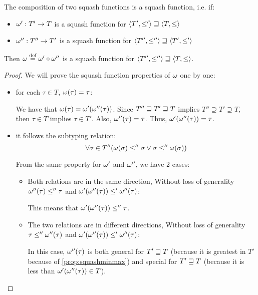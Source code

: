 \documentclass[main.tex]{subfiles}
\begin{document}
\begin{property}\label{prop:squashcomp}
    The composition of two squash functions is a squash function, i.e. if:
    \begin{itemize}
        \item $\omega' : T' \rightarrow T$ is a squash function for
            $\langle T', \leq' \rangle \sqsupseteq \langle T, \leq \rangle$
        \item $\omega'' : T'' \rightarrow T'$ is a squash function for
            $\langle T'', \leq'' \rangle \sqsupseteq \langle T', \leq' \rangle$
    \end{itemize}
    Then $\omega \overset{\text{\scriptsize def}}{=} \omega' \circ \omega''$ is a squash function
    for $\langle T'', \leq'' \rangle \sqsupseteq \langle T, \leq \rangle$.
\end{property}
\begin{proof}
    We will prove the squash function properties of $\omega$ one by one:
    \begin{itemize}
        \item for each $\tau \in T$, $\omega(\tau) = \tau$:

            We have that $\omega(\tau) = \omega'(\omega''(\tau))$.
            Since $T'' \sqsupseteq T' \sqsupseteq T$ implies $T'' \supseteq T' \supseteq T$,
            then $\tau \in T$ implies $\tau \in T'$. Also, $\omega''(\tau) = \tau$.
            Thus, $\omega'(\omega''(\tau)) = \tau$.

        \item it follows the subtyping relation:
            \[ \forall \sigma \in T''
                (\omega(\sigma) \leq'' \sigma \lor \sigma \leq'' \omega(\sigma)) \]

            From the same property for $\omega'$ and $\omega''$, we have 2 cases:
            \begin{itemize}
                \item Both relations are in the same direction,
                    Without loss of generality $\omega''(\tau) \leq'' \tau$ and
                    $\omega'(\omega''(\tau)) \leq' \omega''(\tau)$:


                    This means that $\omega'(\omega''(\tau)) \leq'' \tau$.

                \item The two relations are in different directions,
                    Without loss of generality $\tau \leq'' \omega''(\tau)$ and
                    $\omega'(\omega''(\tau)) \leq' \omega''(\tau)$:

                    In this case, $\omega''(\tau)$ is both general for $T' \sqsupseteq T$
                    (because it is greatest in $T'$ because of \cref{prop:squashminmax})
                    and special for $T' \sqsupseteq T$ (because it is less than
                    $\omega'(\omega''(\tau)) \in T$).


\end{itemize}
\end{itemize}
\end{proof}
\end{document}
